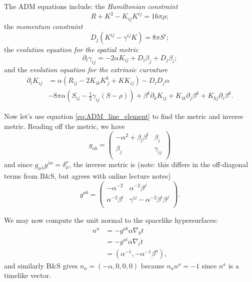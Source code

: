 \documentclass[12pt]{article}
\numberwithin{equation}{section}
\begin{document}
The ADM equations include: the \textit{Hamiltonian constraint}
\begin{equation}
R + K^2 - K_{ij} K^{ij} = 16 \pi \rho;
\end{equation}
the \textit{momentum constraint}
\begin{equation}
D_j (K^{ij} - \gamma^{ij} K) = 8 \pi S^{i};
\end{equation}
the \textit{evolution equation for the spatial metric}
\begin{equation} \label{eq:spatial_metric_evol}
\partial_t \gamma_{ij} = -2 \alpha K_{ij} + D_i \beta_j + D_j \beta_i;
\end{equation}
and the \textit{evolution equation for the extrinsic curvature}
\begin{equation}
\begin{aligned}
\partial_t K_{ij} &= \alpha (R_{ij} - 2 K_{ik} K^{k}_{~j} + K K_{ij}) - D_i D_j \alpha \\
&- 8 \pi \alpha (S_{ij} - \frac{1}{2} \gamma_{ij} (S - \rho)) + \beta^k \partial_k K_{ij} + K_{ik} \partial_j \beta^k + K_{kj} \partial_i \beta^k.
\end{aligned}
\end{equation}

Now let's use equation \ref{eq:ADM_line_element} to find the metric and inverse metric.  Reading off the metric, we have
\begin{equation}
g_{ab} =
\begin{pmatrix}
-\alpha^{2} + \beta_l \beta^l & \beta_i \\
\beta_j & \gamma_{ij}  \\
\end{pmatrix}
\end{equation}
and since $g_{\mu \lambda} g^{\lambda \nu} = \delta^\nu_\mu$, the inverse metric is (note: this differs in the off-diagonal terms from B\&S, but agrees with online lecture notes)
\begin{equation}
g^{ab} = 
\begin{pmatrix}
-\alpha^{-2} & \alpha^{-2} \beta^j \\
\alpha^{-2} \beta^i & \gamma^{ij} - \alpha^{-2} \beta^{i} \beta^{j} \\
\end{pmatrix}.
\end{equation}

We may now compute the unit normal to the spacelike hypersurfaces:
\begin{equation} \label{eq:timelike_normal}
\begin{aligned}
n^a &= -g^{ab} \alpha \nabla_b t \\
&= -g^{a t} \alpha \nabla_t t \\
&= (\alpha^{-1}, -\alpha^{-1} \beta^{a}),
\end{aligned}
\end{equation}
and similarly B\&S gives $n_a = (-\alpha, 0, 0, 0)$ because $n_a n^a = -1$ since $n^a$ is a timelike vector.
\end{document}
